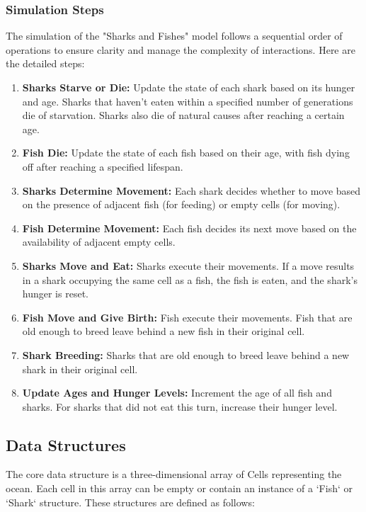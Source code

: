 \documentclass[conference,compsoc]{IEEEtran}
\begin{document}
\subsubsection{Simulation Steps}
The simulation of the "Sharks and Fishes" model follows a sequential order of operations to ensure clarity and manage the complexity of interactions. Here are the detailed steps:

\begin{enumerate}
    \item \textbf{Sharks Starve or Die:} Update the state of each shark based on its hunger and age. Sharks that haven't eaten within a specified number of generations die of starvation. Sharks also die of natural causes after reaching a certain age.
    \item \textbf{Fish Die:} Update the state of each fish based on their age, with fish dying off after reaching a specified lifespan.
    \item \textbf{Sharks Determine Movement:} Each shark decides whether to move based on the presence of adjacent fish (for feeding) or empty cells (for moving).
    \item \textbf{Fish Determine Movement:} Each fish decides its next move based on the availability of adjacent empty cells.
    \item \textbf{Sharks Move and Eat:} Sharks execute their movements. If a move results in a shark occupying the same cell as a fish, the fish is eaten, and the shark's hunger is reset.
    \item \textbf{Fish Move and Give Birth:} Fish execute their movements. Fish that are old enough to breed leave behind a new fish in their original cell.
    \item \textbf{Shark Breeding:} Sharks that are old enough to breed leave behind a new shark in their original cell.
    \item \textbf{Update Ages and Hunger Levels:} Increment the age of all fish and sharks. For sharks that did not eat this turn, increase their hunger level.
\end{enumerate}

\subsection{Data Structures}

The core data structure is a three-dimensional array of Cells representing the ocean. Each cell in this array can be empty or contain an instance of a `Fish` or `Shark` structure. These structures are defined as follows:
\end{document}
